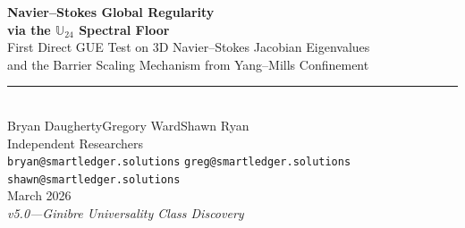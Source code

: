 \documentclass[11pt,a4paper]{article}
\theoremstyle{plain}
\theoremstyle{definition}
\theoremstyle{remark}
\begin{document}
\thispagestyle{empty}


\vspace*{0.5cm}
\begin{center}
  {\fontsize{22}{26}\selectfont\bfseries\color{accent}
   Navier--Stokes Global Regularity\\[2pt]
   via the $\mathbb{U}_{24}$ Spectral Floor}\\[14pt]
  {\large\color{accentlight}
   First Direct GUE Test on 3D Navier--Stokes Jacobian Eigenvalues\\
   and the Barrier Scaling Mechanism from Yang--Mills Confinement}\\[20pt]
  {\color{titlegold}\rule{6cm}{0.8pt}}\\[20pt]
  {\Large Bryan Daugherty\qquad Gregory Ward\qquad Shawn Ryan}\\[8pt]
  {\small\color{subtlegray}
    Independent Researchers\\[2pt]
    \texttt{bryan@smartledger.solutions}\quad
    \texttt{greg@smartledger.solutions}\quad
    \texttt{shawn@smartledger.solutions}}\\[16pt]
  {\normalsize\color{subtlegray} March 2026}\\[6pt]
  {\small\color{subtlegray}\itshape v5.0\enspace---\enspace Ginibre Universality Class Discovery}
\end{center}
\vspace{14pt}
\noindent{}
\vspace{10pt}
\end{document}
